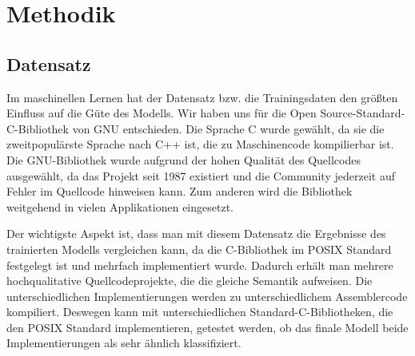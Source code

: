 \documentclass[12pt,letterpaper,ngerman]{article}
\begin{document}
\section{Methodik}
\subsection{Datensatz}
Im maschinellen Lernen hat der Datensatz bzw. die Trainingsdaten
den größten Einfluss auf die Güte des Modells. Wir haben uns 
für die Open Source-Standard-C-Bibliothek von GNU entschieden. 
Die Sprache C wurde gewählt, da sie die zweitpopulärste Sprache 
nach C++ ist, die zu Maschinencode kompilierbar ist.
Die GNU-Bibliothek wurde aufgrund der hohen Qualität des 
Quellcodes ausgewählt, da das Projekt seit 1987 existiert 
und die Community jederzeit auf Fehler im Quellcode hinweisen kann.
Zum anderen wird die Bibliothek weitgehend in vielen Applikationen 
eingesetzt.

Der wichtigste Aspekt ist, dass man mit diesem Datensatz 
die Ergebnisse des trainierten Modells vergleichen kann, da die 
C-Bibliothek im POSIX Standard festgelegt ist und mehrfach 
implementiert wurde. Dadurch erhält man mehrere hochqualitative 
Quellcodeprojekte, die die gleiche Semantik aufweisen. Die 
unterschiedlichen Implementierungen werden zu unterschiedlichem 
Assemblercode kompiliert. Deswegen kann mit unterschiedlichen 
Standard-C-Bibliotheken, die den POSIX Standard implementieren,
getestet werden, ob das finale Modell beide Implementierungen 
als sehr ähnlich klassifiziert.


\pagebreak
\end{document}
